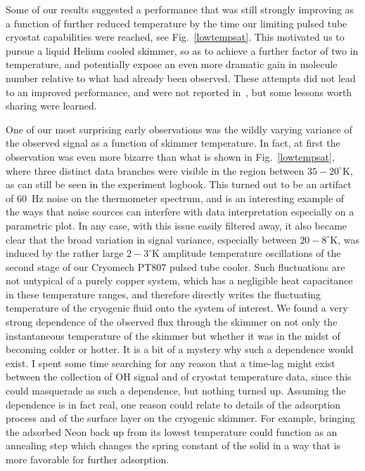 Some of our results suggested a performance that was still strongly improving as a function of further reduced temperature by the time our limiting pulsed tube cryostat capabilities were reached, see Fig.~\ref{lowtempsat}.
This motivated us to pursue a liquid Helium cooled skimmer, so as to achieve a further factor of two in temperature, and potentially expose an even more dramatic gain in molecule number relative to what had already been observed.
These attempts did not lead to an improved performance, and were not reported in~\cite{Wu2018}, but some lessons worth sharing were learned.


One of our most surprising early observations was the wildly varying variance of the observed signal as a function of skimmer temperature. 
In fact, at first the observation was even more bizarre than what is shown in Fig.~\ref{lowtempsat}, where three distinct data branches were visible in the region between $35-20^\circ$K, as can still be seen in the experiment logbook.
This turned out to be an artifact of $60$~Hz noise on the thermometer spectrum, and is an interesting example of the ways that noise sources can interfere with data interpretation especially on a parametric plot.
In any case, with this issue easily filtered away, it also became clear that the broad variation in signal variance, especially between $20-8^\circ$K, was induced by the rather large $2-3^\circ$K amplitude temperature oscillations of the second stage of our Cryomech PT807 pulsed tube cooler.
Such fluctuations are not untypical of a purely copper system, which has a negligible heat capacitance in these temperature ranges, and therefore directly writes the fluctuating temperature of the cryogenic fluid onto the system of interest.
We found a very strong dependence of the observed flux through the skimmer on not only the instantaneous temperature of the skimmer but whether it was in the midst of becoming colder or hotter.
It is a bit of a mystery why such a dependence would exist.
I spent some time searching for any reason that a time-lag might exist between the collection of OH signal and of cryostat temperature data, since this could masquerade as such a dependence, but nothing turned up.
Assuming the dependence is in fact real, one reason could relate to details of the adsorption process and of the surface layer on the cryogenic skimmer.
For example, bringing the adsorbed Neon back up from its lowest temperature could function as an annealing step which changes the spring constant of the solid in a way that is more favorable for further adsorption.

